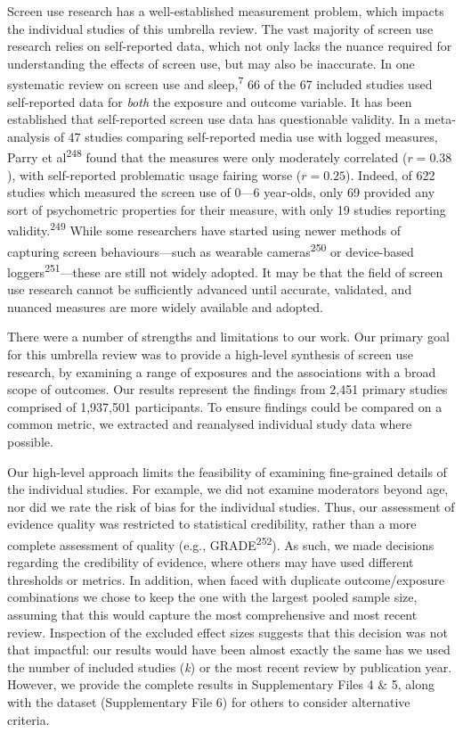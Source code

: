 \documentclass[
  english,
  man]{apa6}
\begin{document}
Screen use research has a well-established measurement problem, which impacts the individual studies of this umbrella review.
The vast majority of screen use research relies on self-reported data, which not only lacks the nuance required for understanding the effects of screen use, but may also be inaccurate.
In one systematic review on screen use and sleep,\textsuperscript{7} 66 of the 67 included studies used self-reported data for \emph{both} the exposure and outcome variable.
It has been established that self-reported screen use data has questionable validity.
In a meta-analysis of 47 studies comparing self-reported media use with logged measures, Parry et al\textsuperscript{248} found that the measures were only moderately correlated (\(r = 0.38\)), with self-reported problematic usage fairing worse (\(r = 0.25\)).
Indeed, of 622 studies which measured the screen use of 0---6 year-olds, only 69 provided any sort of psychometric properties for their measure, with only 19 studies reporting validity.\textsuperscript{249}
While some researchers have started using newer methods of capturing screen behaviours---such as wearable cameras\textsuperscript{250} or device-based loggers\textsuperscript{251}---these are still not widely adopted.
It may be that the field of screen use research cannot be sufficiently advanced until accurate, validated, and nuanced measures are more widely available and adopted.

There were a number of strengths and limitations to our work.
Our primary goal for this umbrella review was to provide a high-level synthesis of screen use research, by examining a range of exposures and the associations with a broad scope of outcomes.
Our results represent the findings from 2,451 primary studies comprised of 1,937,501 participants.
To ensure findings could be compared on a common metric, we extracted and reanalysed individual study data where possible.

Our high-level approach limits the feasibility of examining fine-grained details of the individual studies.
For example, we did not examine moderators beyond age, nor did we rate the risk of bias for the individual studies.
Thus, our assessment of evidence quality was restricted to statistical credibility, rather than a more complete assessment of quality (e.g., GRADE\textsuperscript{252}).
As such, we made decisions regarding the credibility of evidence, where others may have used different thresholds or metrics.
In addition, when faced with duplicate outcome/exposure combinations we chose to keep the one with the largest pooled sample size, assuming that this would capture the most comprehensive and most recent review.
Inspection of the excluded effect sizes suggests that this decision was not that impactful: our results would have been almost exactly the same has we used the number of included studies (\emph{k}) or the most recent review by publication year.
However, we provide the complete results in Supplementary Files 4 \& 5, along with the dataset (Supplementary File 6) for others to consider alternative criteria.
\end{document}
